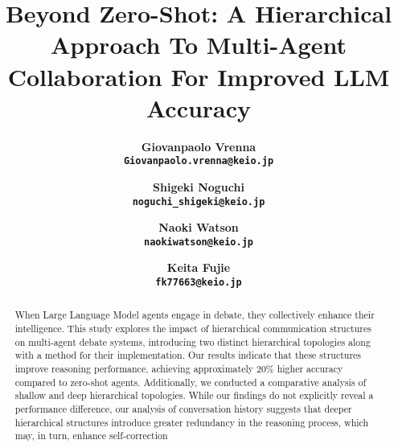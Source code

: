 \title{Beyond Zero-Shot: A Hierarchical Approach To Multi-Agent Collaboration For Improved LLM Accuracy}

\author{
    \bf Giovanpaolo Vrenna \\ \texttt{Giovanpaolo.vrenna@keio.jp} \\
    \and
    \bf Shigeki Noguchi \\ \texttt{noguchi\_shigeki@keio.jp} \\
    \and
    \bf Naoki Watson \\ \texttt{naokiwatson@keio.jp} \\
    \and
    \bf Keita Fujie \\ \texttt{fk77663@keio.jp} \\
}

\date{}
\maketitle
\onehalfspacing

\begin{abstract}
    When Large Language Model agents engage in debate, they collectively enhance their intelligence. This study explores the impact of hierarchical communication structures on multi-agent debate systems, introducing two distinct hierarchical topologies along with a method for their implementation. Our results indicate that these structures improve reasoning performance, achieving approximately 20\% higher accuracy compared to zero-shot agents. Additionally, we conducted a comparative analysis of shallow and deep hierarchical topologies. While our findings do not explicitly reveal a performance difference, our analysis of conversation history suggests that deeper hierarchical structures introduce greater redundancy in the reasoning process, which may, in turn, enhance self-correction
\end{abstract}
